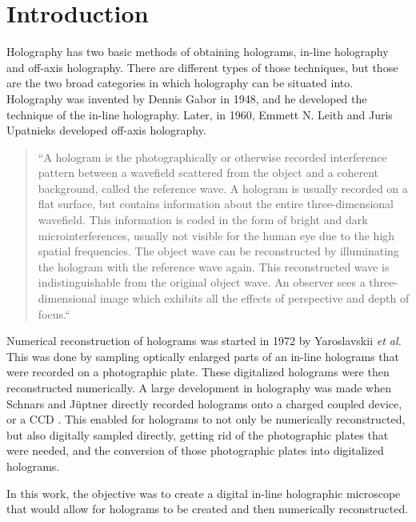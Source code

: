 %
%

\chapter{Introduction} \label{chap:Intro}

Holography has two basic methods of obtaining holograms, in-line holography and
off-axis holography. There are different types of those techniques, but those
are the two broad categories in which holography can be situated into.
Holography was invented by Dennis Gabor in 1948, and he developed the technique
of the in-line holography. Later, in 1960, Emmett N. Leith and Juris Upatnieks developed
off-axis holography.

\begin{quote}
``A hologram is the photographically or otherwise recorded
interference pattern between a wavefield scattered from the
object and a coherent background, called the reference wave.
A hologram is usually recorded on a flat surface, but contains
information about the entire three-dimensional wavefield.
This information is coded in the form of bright and dark
microinterferences, usually not visible for the human eye due
to the high spatial frequencies. The object wave can be
reconstructed by illuminating the hologram with the reference
wave again. This reconstructed wave is indistinguishable from
the original object wave. An observer sees a three-dimensional
image which exhibits all the effects of perspective and depth
of focus.``\cite{schnars_digital_2002}
\end{quote}
Numerical reconstruction of holograms was started in 1972 by Yaroslavskii
\emph{et al.} This was done by sampling optically enlarged parts of an in-line
holograms that were recorded on a photographic plate. These digitalized
holograms were then reconstructed numerically. A large development in
holography was made when Schnars and J\"{u}ptner directly recorded holograms
onto a charged coupled device, or a CCD \cite{schnars_digital_2002}.
This enabled for holograms to not only
be numerically reconstructed, but also digitally sampled directly, getting rid
of the photographic plates that were needed, and the conversion of those
photographic plates into digitalized holograms.

In this work, the objective was to create a digital in-line holographic
microscope that would allow for holograms to be created and then numerically
reconstructed.



